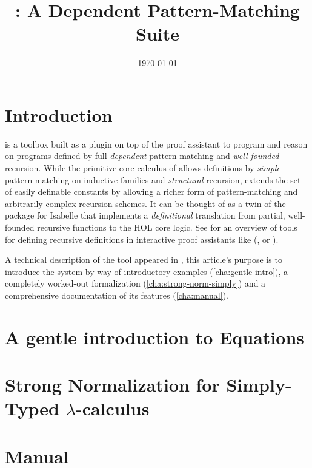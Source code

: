 \documentclass{report}
\author{\myname}
\date{\today}
\title{\Equations: A Dependent Pattern-Matching Suite}
\begin{document}
\maketitle

\def\coqlibrary#1#2#3{}

\def\Equations{\texorpdfstring{\name{Equations}}{Equations}}

\chapter*{Introduction}
\label{cha:introduction}

\Equations is a toolbox built as a plugin on top of the \Coq proof assistant
to program and reason on programs defined by full \emph{dependent}
pattern-matching and \emph{well-founded} recursion. While the primitive
core calculus of \Coq allows definitions by \emph{simple} pattern-matching on
inductive families and \emph{structural} recursion, \Equations extends
the set of easily definable constants by allowing a richer form of
pattern-matching and arbitrarily complex recursion schemes. It can be
thought of as a twin of the  package for Isabelle that
implements a \emph{definitional} translation from partial, well-founded
recursive functions to the HOL core logic. See
\cite{BoveKraussSozeau2011} for an overview of tools for defining
recursive definitions in interactive proof assistants like (\Coq, \Agda
or \Isabelle).

A technical description of the tool appeared in
\cite{sozeau.Coq/Equations/ITP10}, this article's purpose is to
introduce the system by way of introductory examples
(\autoref{cha:gentle-intro}), a completely worked-out formalization
(\autoref{cha:strong-norm-simply}) and a comprehensive documentation of
its features (\autoref{cha:manual}).

\doparttoc
\parttoc
\tableofcontents

\chapter{A gentle introduction to Equations}
\label{cha:gentle-intro}


\chapter{Strong Normalization for Simply-Typed \texorpdfstring{$\lambda$}{Lambda}-calculus}
\label{cha:strong-norm-simply}


\chapter{Manual}
\label{cha:manual}




\label{cha:bibliography}

\end{document}
